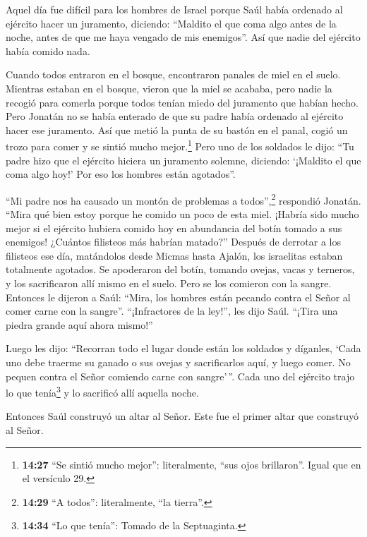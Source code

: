  Aquel día fue difícil para los hombres de Israel porque
Saúl había ordenado al ejército hacer un juramento, diciendo: ``Maldito
el que coma algo antes de la noche, antes de que me haya vengado de mis
enemigos''. Así que nadie del ejército había comido nada.

 Cuando todos entraron en el bosque, encontraron panales
de miel en el suelo.  Mientras estaban en el bosque,
vieron que la miel se acababa, pero nadie la recogió para comerla porque
todos tenían miedo del juramento que habían hecho.  Pero
Jonatán no se había enterado de que su padre había ordenado al ejército
hacer ese juramento. Así que metió la punta de su bastón en el panal,
cogió un trozo para comer y se sintió mucho mejor.\footnote{\textbf{14:27}
  ``Se sintió mucho mejor'': literalmente, ``sus ojos brillaron''. Igual
  que en el versículo 29.}  Pero uno de los soldados le
dijo: ``Tu padre hizo que el ejército hiciera un juramento solemne,
diciendo: `¡Maldito el que coma algo hoy!' Por eso los hombres están
agotados''.

 ``Mi padre nos ha causado un montón de problemas a
todos'',\footnote{\textbf{14:29} ``A todos'': literalmente, ``la
  tierra''.} respondió Jonatán. ``Mira qué bien estoy porque he comido
un poco de esta miel.  ¡Habría sido mucho mejor si el
ejército hubiera comido hoy en abundancia del botín tomado a sus
enemigos! ¿Cuántos filisteos más habrían matado?'' 
Después de derrotar a los filisteos ese día, matándolos desde Micmas
hasta Ajalón, los israelitas estaban totalmente agotados.
 Se apoderaron del botín, tomando ovejas, vacas y
terneros, y los sacrificaron allí mismo en el suelo. Pero se los
comieron con la sangre.  Entonces le dijeron a Saúl:
``Mira, los hombres están pecando contra el Señor al comer carne con la
sangre''. ``¡Infractores de la ley!'', les dijo Saúl. ``¡Tira una piedra
grande aquí ahora mismo!''

 Luego les dijo: ``Recorran todo el lugar donde están los
soldados y díganles, `Cada uno debe traerme su ganado o sus ovejas y
sacrificarlos aquí, y luego comer. No pequen contra el Señor comiendo
carne con sangre'\,''. Cada uno del ejército trajo lo que
tenía\footnote{\textbf{14:34} ``Lo que tenía'': Tomado de la
  Septuaginta.} y lo sacrificó allí aquella noche.

 Entonces Saúl construyó un altar al Señor. Este fue el
primer altar que construyó al Señor.

